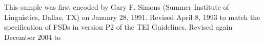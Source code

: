 \begin{shaded}
\hspace*{1em}\hspace*{1em}\hspace*{1em}\mbox{}\newline 
\hspace*{1em}\hspace*{1em}\mbox{}\newline 
\hspace*{1em}\hspace*{1em}\mbox{}\newline 
\hspace*{1em}\hspace*{1em}\hspace*{1em}This sample was first encoded by Gary F. Simons (Summer\mbox{}\newline 
\hspace*{1em}\hspace*{1em}\hspace*{1em}\hspace*{1em}\hspace*{1em}\hspace*{1em}\hspace*{1em}\hspace*{1em} Institute of Linguistics, Dallas, TX) on January 28, 1991.\mbox{}\newline 
\hspace*{1em}\hspace*{1em}\hspace*{1em}\hspace*{1em}\hspace*{1em}\hspace*{1em}\hspace*{1em}\hspace*{1em} Revised April 8, 1993 to match the specification of FSDs\mbox{}\newline 
\hspace*{1em}\hspace*{1em}\hspace*{1em}\hspace*{1em}\hspace*{1em}\hspace*{1em}\hspace*{1em}\hspace*{1em} in version P2 of the TEI Guidelines. Revised again December 2004 to\mbox{}\newline 

\end{shaded}
